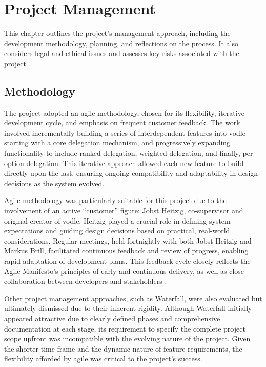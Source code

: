 \chapter{Project Management}\label{ch:project_management}

This chapter outlines the project's management approach, including the development methodology, planning, and reflections on the process. It also considers legal and ethical issues and assesses key risks associated with the project.

\section{Methodology}
The project adopted an agile methodology, chosen for its flexibility, iterative development cycle, and emphasis on frequent customer feedback. The work involved incrementally building a series of interdependent features into vodle -- starting with a core delegation mechanism, and progressively expanding functionality to include ranked delegation, weighted delegation, and finally, per-option delegation. This iterative approach allowed each new feature to build directly upon the last, ensuring ongoing compatibility and adaptability in design decisions as the system evolved.

Agile methodology was particularly suitable for this project due to the involvement of an active ``customer'' figure: Jobst Heitzig, co-supervisor and original creator of vodle. Heitzig played a crucial role in defining system expectations and guiding design decisions based on practical, real-world considerations. Regular meetings, held fortnightly with both Jobst Heitzig and Markus Brill, facilitated continuous feedback and review of progress, enabling rapid adaptation of development plans. This feedback cycle closely reflects the Agile Manifesto's principles of early and continuous delivery, as well as close collaboration between developers and stakeholders \citep{agilemanifesto2001}.

Other project management approaches, such as Waterfall, were also evaluated but ultimately dismissed due to their inherent rigidity. Although Waterfall initially appeared attractive due to clearly defined phases and comprehensive documentation at each stage, its requirement to specify the complete project scope upfront was incompatible with the evolving nature of the project. Given the shorter time frame and the dynamic nature of feature requirements, the flexibility afforded by agile was critical to the project's success.

